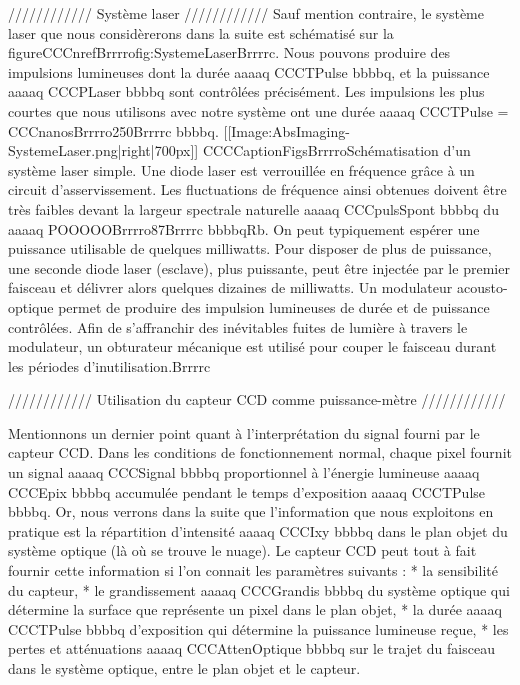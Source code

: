 //////////// Système laser ////////////
Sauf mention contraire, le système laser que nous considèrerons dans la suite est schématisé sur la figureCCCnrefBrrrrofig:SystemeLaserBrrrrc.
Nous pouvons produire des impulsions lumineuses dont la durée aaaaq CCCTPulse bbbbq, et la puissance aaaaq CCCPLaser bbbbq sont contrôlées précisément. Les impulsions les plus courtes que nous utilisons avec notre système ont une durée aaaaq CCCTPulse = CCCnanosBrrrro250Brrrrc bbbbq.
[[Image:AbsImaging-SystemeLaser.png|right|700px]]
CCCCaptionFigsBrrrroSchématisation d'un système laser simple. Une diode laser est verrouillée en fréquence grâce à un circuit d'asservissement. Les fluctuations de fréquence ainsi obtenues doivent être très faibles devant la largeur spectrale naturelle aaaaq CCCpulsSpont bbbbq du aaaaq POOOOOBrrrro87Brrrrc bbbbqRb. On peut typiquement espérer une puissance utilisable de quelques milliwatts. Pour disposer de plus de puissance, une seconde diode laser (esclave), plus puissante, peut être injectée par le premier faisceau et délivrer alors quelques dizaines de milliwatts. Un modulateur acousto-optique permet de produire des impulsion lumineuses de durée et de puissance contrôlées. 
Afin de s'affranchir des inévitables fuites de lumière à travers le modulateur, un obturateur mécanique est utilisé pour couper le faisceau durant les périodes d'inutilisation.Brrrrc




//////////// Utilisation du capteur CCD comme puissance-mètre ////////////

Mentionnons un dernier point quant à l'interprétation du signal fourni par le capteur CCD. Dans les conditions de fonctionnement normal, chaque pixel fournit un signal aaaaq CCCSignal bbbbq proportionnel à l'énergie lumineuse aaaaq CCCEpix bbbbq accumulée pendant le temps d'exposition aaaaq CCCTPulse bbbbq. Or, nous verrons dans la suite que l'information que nous exploitons en pratique est la répartition d'intensité aaaaq CCCIxy bbbbq dans le plan objet du système optique (là où se trouve le nuage). Le capteur CCD peut tout à fait fournir cette information si l'on connait les paramètres suivants :
	* la sensibilité du capteur,
	* le grandissement aaaaq CCCGrandis bbbbq 		du système optique qui détermine la surface que représente un pixel dans le plan objet,
	* la durée aaaaq CCCTPulse bbbbq 		d'exposition qui détermine la puissance lumineuse reçue,
	* les pertes et atténuations aaaaq CCCAttenOptique bbbbq sur le trajet du faisceau dans le système optique, entre le plan objet et le capteur.

